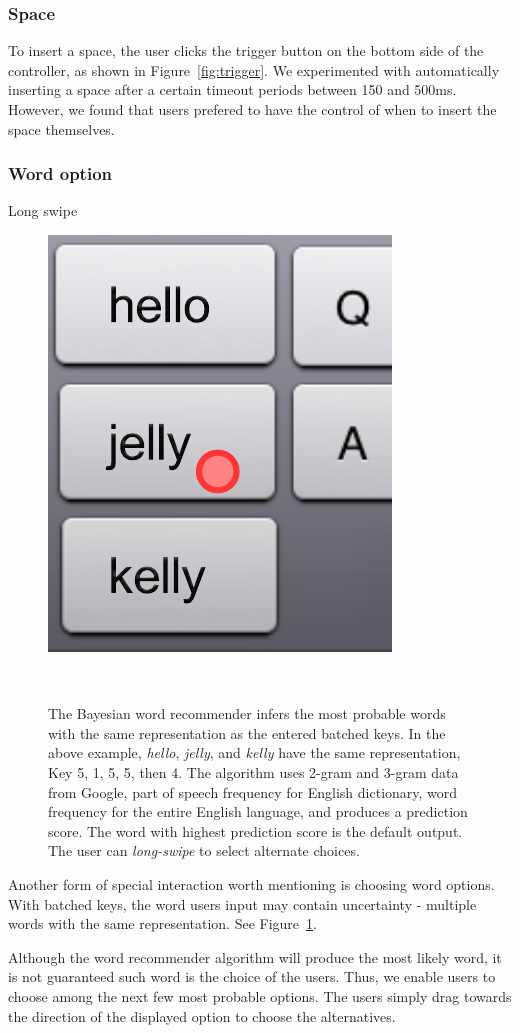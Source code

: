 \documentclass{sigchi}
\begin{document}
\subsubsection{Space}
To insert a space, the user clicks the trigger button on the bottom side of the controller, as shown in Figure~\ref{fig:trigger}. 
We experimented with automatically inserting a space after a certain timeout periods between 150 and 500ms.  However, we found that users prefered to have the control of when to insert the space themselves.




\subsubsection{Word option}
Long swipe


\begin{figure}
  \centering

  \includegraphics[width=.3\columnwidth]{figures/multiword}
  
  \caption{The Bayesian word recommender infers the most probable words with the same representation as the entered batched keys. In the above example, \textit{hello}, \textit{jelly}, and \textit{kelly} have the same representation, Key 5, 1, 5, 5, then 4. The algorithm uses 2-gram and 3-gram data from Google, part of speech frequency for English dictionary, word frequency for the entire English language, and produces a prediction score. The word with highest prediction score is the default output.  The user can \textit{long-swipe} to select alternate choices.}
  ~\label{fig:multiword}
\end{figure}


Another form of special interaction worth mentioning is choosing word options.
With batched keys, the word users input may contain uncertainty - multiple words with the same representation. See Figure~\ref{fig:multiword}.

Although the word recommender algorithm will produce the most likely word, it is not guaranteed such word is the choice of the users.
Thus, we enable users to choose among the next few most probable options.
The users simply drag towards the direction of the displayed option to choose the alternatives.
\end{document}
